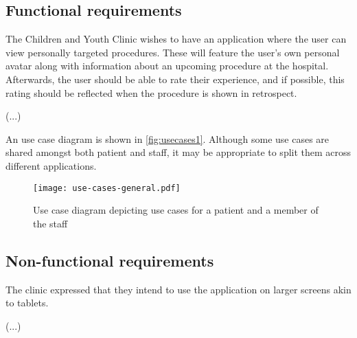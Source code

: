 \subsection{Functional requirements}

The Children and Youth Clinic wishes to have an application where the user can view personally targeted procedures. These will feature the user's own personal avatar along with information about an upcoming procedure at the hospital. Afterwards, the user should be able to rate their experience, and if possible, this rating should be reflected when the procedure is shown in retrospect.

(...)

An use case diagram is shown in \autoref{fig:usecases1}. Although some use cases are shared amongst both patient and staff, it may be appropriate to split them across different applications.


\begin{figure}
    \centering
    \texttt{[image: use-cases-general.pdf]}
    \caption{Use case diagram depicting use cases for a patient and a member of the staff}
    \label{fig:usecases1}
\end{figure}

\subsection{Non-functional requirements}

The clinic expressed that they intend to use the application on larger screens akin to tablets.

(...)

